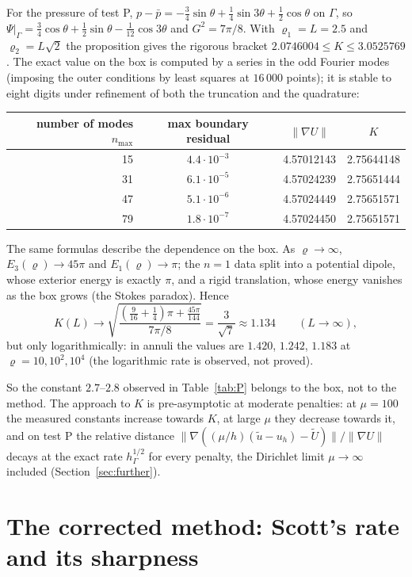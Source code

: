 \documentclass[pdflatex,sn-mathphys-num]{sn-jnl}
\theoremstyle{thmstyleone}
\theoremstyle{thmstylethree}
\newcommand{\hG}{h_\Gamma}
\newcommand{\ut}{\tilde u}
\newcommand{\pbar}{\bar p}
\newcommand{\norm}[1]{\lVert #1\rVert}
\begin{document}
For the pressure of test P, $p-\pbar=-\frac34\sin\theta+\frac14\sin3\theta+\frac12\cos\theta$ on $\Gamma$, so $\Psi|_\Gamma=\frac34\cos\theta+\frac12\sin\theta-\frac1{12}\cos3\theta$ and $G^2=7\pi/8$. With $\varrho_1=L=2.5$ and $\varrho_2=L\sqrt2$ the proposition gives the rigorous bracket $2.0746004\le K\le3.0525769$. The exact value on the box is computed by a series in the odd Fourier modes (imposing the outer conditions by least squares at $16\,000$ points); it is stable to eight digits under refinement of both the truncation and the quadrature:
\begin{center}\small
\begin{tabular}{rccc}
\toprule
number of modes $n_{\max}$ & max boundary residual & $\norm{\nabla U}$ & $K$\\
\midrule
15 & $4.4\cdot10^{-3}$ & 4.57012143 & 2.75644148\\
31 & $6.1\cdot10^{-5}$ & 4.57024239 & 2.75651444\\
47 & $5.1\cdot10^{-6}$ & 4.57024449 & 2.75651571\\
79 & $1.8\cdot10^{-7}$ & 4.57024450 & 2.75651571\\
\bottomrule
\end{tabular}
\end{center}
The same formulas describe the dependence on the box. As $\varrho\to\infty$, $E_3(\varrho)\to45\pi$ and $E_1(\varrho)\to\pi$; the $n=1$ data split into a potential dipole, whose exterior energy is exactly $\pi$, and a rigid translation, whose energy vanishes as the box grows (the Stokes paradox). Hence
\[
K(L)\longrightarrow\sqrt{\frac{(\frac9{16}+\frac14)\pi+\frac{45\pi}{144}}{7\pi/8}}=\frac3{\sqrt7}\approx1.134\qquad(L\to\infty),
\]
but only logarithmically: in annuli the values are $1.420$, $1.242$, $1.183$ at $\varrho=10,10^2,10^4$ (the logarithmic rate is observed, not proved).

So the constant $2.7$--$2.8$ observed in Table~\ref{tab:P} belongs to the box, not to the method. The approach to $K$ is pre-asymptotic at moderate penalties: at $\mu=100$ the measured constants increase towards $K$, at large $\mu$ they decrease towards it, and on test P the relative distance $\norm{\nabla((\mu/h)(\ut-u_h)-\tilde U)}/\norm{\nabla U}$ decays at the exact rate $\hG^{1/2}$ for every penalty, the Dirichlet limit $\mu\to\infty$ included (Section~\ref{sec:further}).

\section{The corrected method: Scott's rate and its sharpness}\label{sec:corrected}
\end{document}
